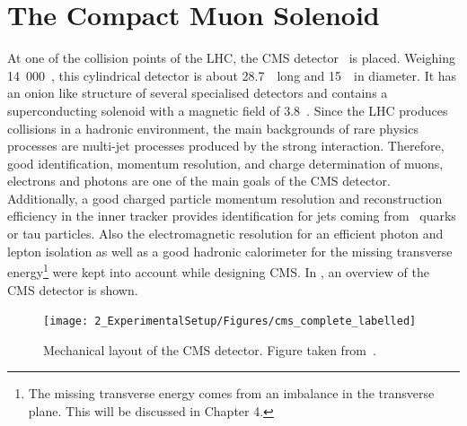 \section{The Compact Muon Solenoid}
\label{sec:CMS}
At one of the collision points of the LHC, the CMS detector~\cite{CMS,Bayatian:922757} is placed. Weighing 14~000~\tonne, this cylindrical detector is about 28.7~\meter\ long and 15~\meter\ in diameter. It has an onion like structure of several specialised detectors and contains a superconducting solenoid with a magnetic field of 3.8~\Tesla. Since the LHC produces collisions in a hadronic environment,  the main backgrounds of rare physics processes are  multi-jet processes produced by the strong interaction. Therefore, good identification, momentum resolution, and charge determination of muons, electrons and photons are one of the main goals of the CMS detector. Additionally, a good charged particle momentum resolution and reconstruction efficiency in the inner tracker provides identification for jets coming from \Pbottom\ quarks or tau particles. Also the electromagnetic resolution for an efficient photon and lepton isolation as well as a good hadronic calorimeter for the missing transverse energy\footnote{The missing transverse energy comes from an imbalance in the transverse plane. This will be discussed in Chapter 4.} were kept into account while designing CMS. In , an overview of the CMS detector is shown. 
\begin{figure}[htbp]
	\centering
	\texttt{[image: 2\_ExperimentalSetup/Figures/cms\_complete\_labelled]}
	\caption{Mechanical layout of the CMS detector. Figure taken from~\cite{CMSdraw}.}
	\label{fig:CMS}
\end{figure}

\newpage
